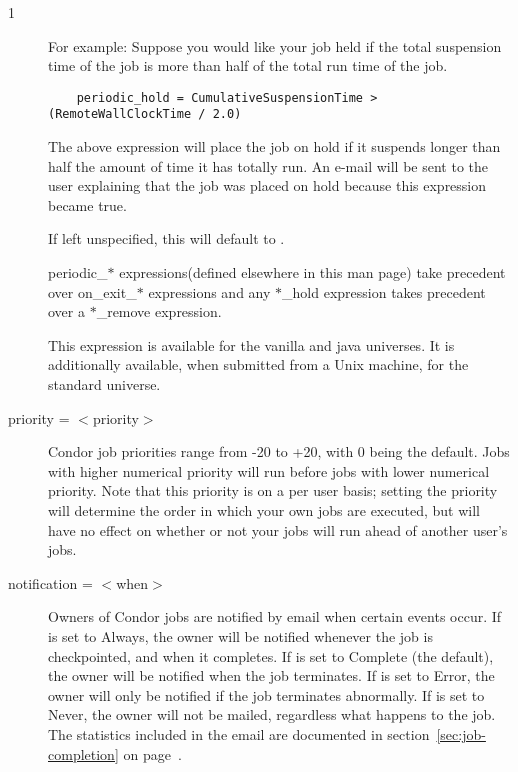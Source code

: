 \begin{ManPage}{\label{man-condor-submit}}{1}
\begin{description}
For example:
Suppose you would like your job held if the total suspension time of the
job is more than half of the total run time of the job.

\begin{verbatim}
	periodic_hold = CumulativeSuspensionTime > (RemoteWallClockTime / 2.0)
\end{verbatim}

The above expression will place the job on hold if it suspends longer
than half the amount of time it has totally run.  An e-mail will be
sent to the user explaining that the job was placed on hold because this
expression became true.

If left unspecified, this will default to .

periodic\_$*$ expressions(defined elsewhere in this man page) take
precedent over on\_exit\_$*$ expressions and any $*$\_hold expression takes
precedent over a $*$\_remove expression.

This expression is available for the vanilla and java universes.
It is additionally available, when submitted from a Unix machine,
for the standard universe.



\item[priority = $<$priority$>$] Condor job priorities range from -20 to
+20, with 0 being the default. Jobs with higher numerical priority will
run before jobs with lower numerical priority. Note that this priority
is on a per user basis; setting the priority will determine the order in
which your own jobs are executed, but will have no effect on whether or
not your jobs will run ahead of another user's jobs. 


\item[notification = $<$when$>$]\label{man-condor-submit-notification} Owners of Condor jobs are notified by
email when certain events occur.
If  is set to \mbox{Always}, the owner will be notified
whenever the job is checkpointed, and when it completes.
If  is set to \mbox{Complete} (the default), the owner will
be notified when the job terminates.
If  is set to \mbox{Error}, the owner will only be notified
if the job terminates abnormally.
If  is set to \mbox{Never}, the owner will not be mailed,
regardless what happens to the job.
The statistics included in the email are documented in
section~\ref{sec:job-completion} on
page~\pageref{sec:job-completion}.


\end{description}
\end{ManPage}
